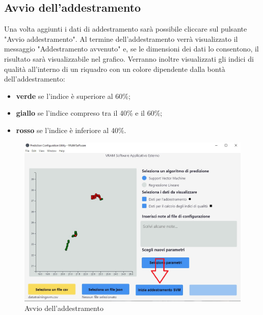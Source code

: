 	\subsection{Avvio dell'addestramento}
	Una volta aggiunti i dati di addestramento sarà possibile cliccare sul pulsante "Avvio addestramento". Al termine dell'addestramento verrà visualizzato il messaggio "Addestramento avvenuto" e, se le dimensioni dei dati lo consentono, il risultato sarà visualizzabile nel grafico. Verranno inoltre visualizzati gli indici di qualità all'interno di un riquadro con un colore dipendente dalla bontà dell'addestramento:
	\begin{itemize}
		\item \textbf{verde} se l'indice è superiore al 60\%;
		\item \textbf{giallo} se l'indice compreso tra il 40\% e il 60\%;
		\item \textbf{rosso} se l'indice è inferiore al 40\%.
	\end{itemize}
	\begin{figure}[H] 	
		\begin{center}
			\includegraphics[width=\linewidth]{img/4.png}
		\end{center}
		\caption{Avvio dell'addestramento}	
	\end{figure}
